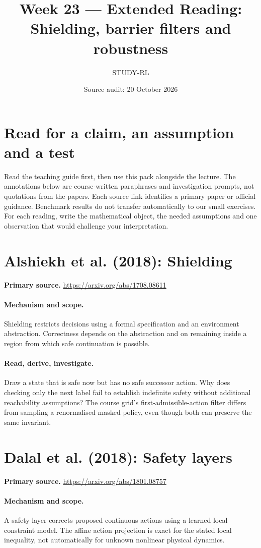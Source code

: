 \documentclass[11pt]{scrartcl}
\title{Week 23 --- Extended Reading: Shielding, barrier filters and robustness}
\author{STUDY-RL}
\date{Source audit: 20 October 2026}
\begin{document}
\maketitle
\section*{Read for a claim, an assumption and a test}
Read the teaching guide first, then use this pack alongside the lecture.
The annotations below are course-written paraphrases and investigation prompts,
not quotations from the papers. Each source link identifies a primary paper
or official guidance. Benchmark results do not transfer automatically to our
small exercises. For each reading, write the mathematical object, the needed
assumptions and one observation that would challenge your interpretation.

\section{Alshiekh et al. (2018): Shielding}
\noindent\textbf{Primary source.} \url{https://arxiv.org/abs/1708.08611}

\paragraph{Mechanism and scope.} Shielding restricts decisions using a formal specification and an environment abstraction. Correctness depends on the abstraction and on remaining inside a region from which safe continuation is possible.

\paragraph{Read, derive, investigate.} Draw a state that is safe now but has no safe successor action. Why does checking only the next label fail to establish indefinite safety without additional reachability assumptions? The course grid's first-admissible-action filter differs from sampling a renormalised masked policy, even though both can preserve the same invariant.

\section{Dalal et al. (2018): Safety layers}
\noindent\textbf{Primary source.} \url{https://arxiv.org/abs/1801.08757}

\paragraph{Mechanism and scope.} A safety layer corrects proposed continuous actions using a learned local constraint model. The affine action projection is exact for the stated local inequality, not automatically for unknown nonlinear physical dynamics.
\end{document}
